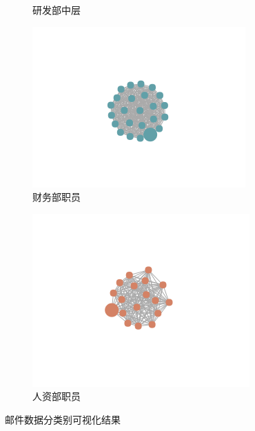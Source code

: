\documentclass[journal]{vgtc}                %
\begin{document}
\begin{figure}
\begin{subfigure}{0.3\linewidth}
		\caption{研发部中层} %
		\label{fig:med}
	\end{subfigure}
	\begin{subfigure}{0.3\linewidth} %
		\includegraphics[width=\linewidth]{pictures/5-3.png}
		\caption{财务部职员} %
		\label{fig:finance}
	\end{subfigure}
	\begin{subfigure}{0.3\linewidth} %
		\includegraphics[width=\linewidth]{pictures/5-4.png}
		\caption{人资部职员} %
		\label{fig:hr}
	\end{subfigure}
	\caption{邮件数据分类别可视化结果} %
\end{figure}
\end{document}
